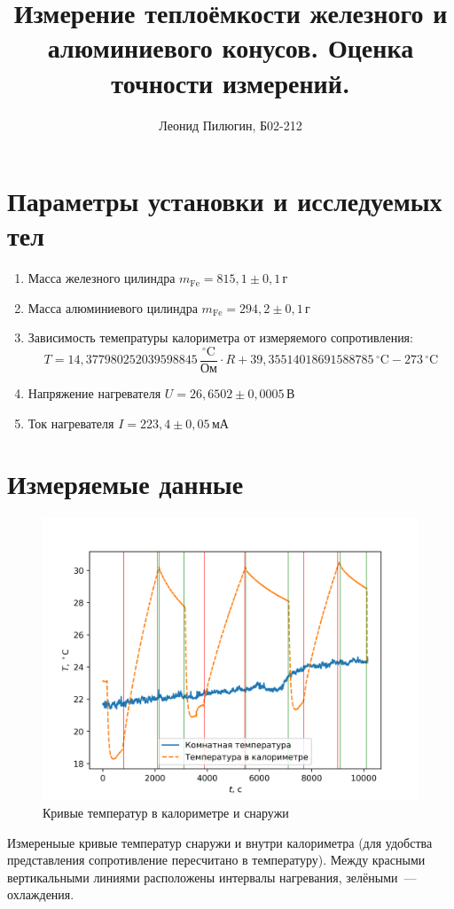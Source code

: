 \documentclass[a4paper, 12pt]{article}
\title{Измерение теплоёмкости железного и алюминиевого конусов. Оценка точности измерений.}
\author{Леонид Пилюгин, Б02-212}
\begin{document}
    \maketitle

    \section{Параметры установки и исследуемых тел}

    \begin{enumerate}
        \item Масса железного цилиндра $m_\text{Fe}=815{,}1\pm 0{,}1\,\text{г}$
        \item Масса алюминиевого цилиндра $m_\text{Fe}=294{,}2\pm 0{,}1\,\text{г}$
        \item Зависимость темепратуры калориметра от измеряемого сопротивления:
        \[T=14{,}377980252039598845\,\frac{^\circ\text{C}}{\text{Ом}}\cdot R + 39{,}35514018691588785\,^\circ\text{C} - 273\,^\circ\text{C}\]
        \item Напряжение нагревателя $U=26{,}6502\pm0{,}0005\,\text{В}$
        \item Ток нагревателя $I=223{,}4\pm0{,}05\,\text{мА}$
    \end{enumerate}

    \section{Измеряемые данные}
    \begin{figure}[ht!]
        \centering\includegraphics[width=0.8\linewidth]{img/fig.png}
        \caption{Кривые температур в калориметре и снаружи}
    \end{figure}

    Измереныые кривые температур снаружи и внутри калориметра (для удобства представления
    сопротивление пересчитано в температуру).
    Между красными вертикальными линиями расположены интервалы нагревания, зелёными~--- охлаждения.
\end{document}
